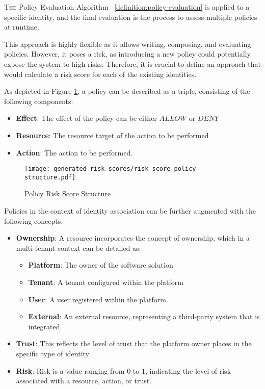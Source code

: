 \lettrine{T}{he} Policy Evaluation Algorithm ~\ref{definition:policy-evaluation} is applied to a specific identity, and the final evaluation is the process to assess multiple policies at runtime. 

\vspace{15pt}

This approach is highly flexible as it allows writing, composing, and evaluating policies. 
However, it poses a risk, as introducing a new policy could potentially expose the system to high risks. Therefore, it is crucial to define an approach that would calculate a risk score for each of the existing identities.

\vspace{15pt}

As depicted in Figure \ref{fig:risk-score-policy-structure}, a policy can be described as a triple, consisting of the following components:

\begin{itemize}
    \item \textbf{Effect}: The effect of the policy can be either $ALLOW$ or $DENY$
    \item \textbf{Resource}: The resource target of the action to be performed
    \item \textbf{Action}: The action to be performed.
\end{itemize}

\begin{figure}[h]
    \centering
    \texttt{[image: generated-risk-scores/risk-score-policy-structure.pdf]}
    \caption{Policy Risk Score Structure}
    \label{fig:risk-score-policy-structure}
\end{figure}

Policies in the context of identity association can be further augmented with the following concepts:
\begin{itemize}
    \item \textbf{Ownership}: A  resource incorporates the concept of ownership, which in a multi-tenant context can be detailed as:
    \begin{itemize}
        \item \textbf{Platform}: The owner of the software solution
        \item \textbf{Tenant}: A tenant configured within the platform
        \item \textbf{User}: A user registered within the platform.
        \item \textbf{External}: An external resource, representing a third-party system that is integrated.
     \end{itemize}
    \item \textbf{Trust}: This reflects the level of trust that the platform owner places in the specific type of identity
    \item \textbf{Risk}: Risk is a value ranging from $0$ to $1$, indicating the level of risk associated with a resource, action, or trust.
\end{itemize}

